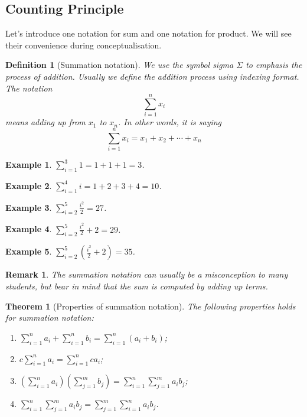 \documentclass[12pt]{article}
\newtheorem{definition}{Definition}[section]
\newtheorem*{theorem}{Theorem}
\newtheorem*{remark}{Remark}
\newtheorem*{example}{Example}
\begin{document}
    \subsection{Counting Principle}

    Let's introduce one notation for sum and one notation for product. We will see their convenience during conceptualisation.

    \begin{definition}[Summation notation]
        We use the symbol sigma $\Sigma$ to emphasis the process of addition. Usually we define the addition process using indexing format. The notation $$\sum_{i=1}^{n}x_i$$ means adding up from $x_1$ to $x_n$. In other words, it is saying $$\sum_{i=1}^{n}x_i = x_1+x_2+\cdots+x_n$$
    \end{definition}

    \begin{example}
        $\displaystyle\sum_{i=1}^{3}1 = 1+1+1 = 3$. 
    \end{example}

    \begin{example}
        $\displaystyle\sum_{i=1}^{4}i=1+2+3+4=10$.
    \end{example}

    \begin{example}
        $\displaystyle\sum_{i=2}^{5}\frac{i^2}{2}=27$.
    \end{example}

    \begin{example}
        $\displaystyle\sum_{i=2}^{5}\frac{i^2}{2}+2=29$.
    \end{example}

    \begin{example}
        $\displaystyle\sum_{i=2}^{5}(\frac{i^2}{2}+2)=35$.
    \end{example}

    \begin{remark}
        The summation notation can usually be a misconception to many students, but bear in mind that the sum is computed by adding up terms.
    \end{remark}

    \begin{theorem}[Properties of summation notation]
        The following properties holds for summation notation:\begin{enumerate}
            \item $\displaystyle\sum_{i=1}^{n}a_i+\sum_{i=1}^{n}b_i=\sum_{i=1}^{n}(a_i+b_i)$;
            \item $\displaystyle c\sum_{i=1}^{n}a_i=\sum_{i=1}^{n}ca_i$;
            \item $\displaystyle (\sum_{i=1}^{n}a_i)(\sum_{j=1}^{m}b_j)=\sum_{i=1}^{n}\sum_{j=1}^{m}a_ib_j$;
            \item $\displaystyle \sum_{i=1}^{n}\sum_{j=1}^{m}a_ib_j=\sum_{j=1}^{m}\sum_{i=1}^{n}a_ib_j$.
        \end{enumerate}
    \end{theorem}
\end{document}
